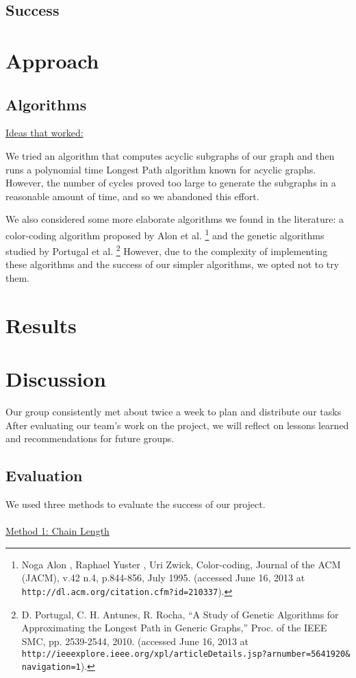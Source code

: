 \documentclass[11pt,english]{article}
\begin{document}
\subsection{Success}

\section{Approach}

\subsection{Algorithms}
\underline{Ideas that worked:}

We tried an algorithm that computes acyclic subgraphs of our graph and then
runs a polynomial time Longest Path algorithm known for acyclic graphs.
However, the number of cycles proved too large to generate the subgraphs in a
reasonable amount of time, and so we abandoned this effort.

We also considered some more elaborate algorithms we found in the literature:
a color-coding algorithm proposed by Alon et al.\hspace{-0.2cm}
\footnote{Noga Alon , Raphael Yuster , Uri Zwick, Color-coding, Journal of the
ACM (JACM), v.42 n.4, p.844-856, July 1995. (accessed June 16, 2013 at
\texttt{http://dl.acm.org/citation.cfm?id=210337}).}
and the genetic algorithms studied by Portugal et al.\hspace{-0.2cm}
\footnote{
D. Portugal, C. H. Antunes, R. Rocha, ``A Study of Genetic Algorithms for
Approximating the Longest Path in Generic Graphs,'' Proc. of the IEEE SMC, pp.
2539-2544, 2010. (accessed June 16, 2013 at
\texttt{http://ieeexplore.ieee.org/xpl/articleDetails.jsp?arnumber=5641920\&
navigation=1}).}
However, due to the complexity of implementing these algorithms and the success
of our simpler algorithms, we opted not to try them.

\section{Results}

\section{Discussion}
Our group consistently met about twice a week to plan and distribute our tasks
After evaluating our team's work on the project, we will reflect on lessons
learned and recommendations for future groups.
\subsection{Evaluation}
We used three methods to evaluate the success of our project.\\\\
\underline{Method 1: Chain Length}
\end{document}
